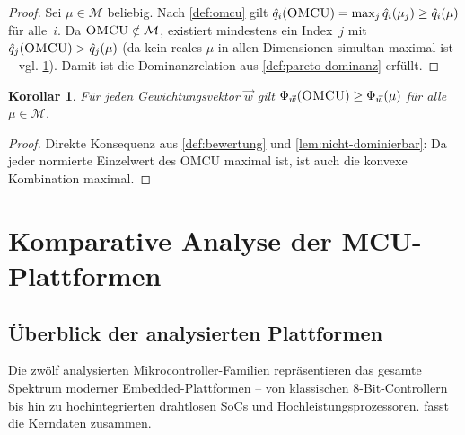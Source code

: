 ﻿\documentclass[12pt, a4paper]{article}
\theoremstyle{plain}
\newtheorem{korollar}[theorem]{Korollar}
\theoremstyle{definition}
\theoremstyle{remark}
\newcommand{\omcu}{\textsc{OMCU}}
\begin{document}
\begin{proof}
  Sei $\mu \in \mathcal{M}$ beliebig.
  Nach \cref{def:omcu} gilt $\hat{q}_i(\omcu{}) = \max_j \hat{q}_i(\mu_j)
  \ge \hat{q}_i(\mu)$ für alle~$i$.
  Da $\omcu{} \notin \mathcal{M}$, existiert mindestens ein Index~$j$ mit
  $\hat{q}_j(\omcu{}) > \hat{q}_j(\mu)$ (da kein reales $\mu$ in allen
  Dimensionen simultan maximal ist -- vgl. \cref{sec:analyse}).
  Damit ist die Dominanzrelation aus \cref{def:pareto-dominanz} erfüllt.
\end{proof}

\begin{korollar}
\label{kor:phi-max}
  Für jeden Gewichtungsvektor $\vec{w}$ gilt
  $\Phi_{\vec{w}}(\omcu{}) \ge \Phi_{\vec{w}}(\mu)$
  für alle $\mu \in \mathcal{M}$.
\end{korollar}

\begin{proof}
  Direkte Konsequenz aus \cref{def:bewertung} und \cref{lem:nicht-dominierbar}:
  Da jeder normierte Einzelwert des \omcu{} maximal ist, ist auch die konvexe
  Kombination maximal.
\end{proof}

\section{Komparative Analyse der MCU-Plattformen}
\label{sec:analyse}

\subsection{Überblick der analysierten Plattformen}

Die zwölf analysierten Mikrocontroller-Familien repräsentieren das gesamte
Spektrum moderner Embedded-Plattformen -- von klassischen 8-Bit-Controllern
bis hin zu hochintegrierten drahtlosen SoCs und Hochleistungsprozessoren.
 fasst die Kerndaten zusammen.
\end{document}

